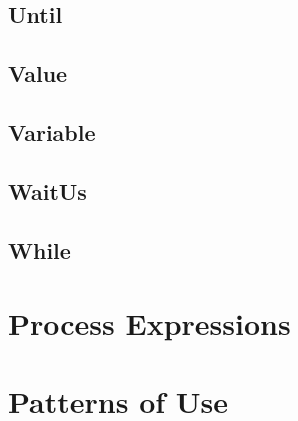 \subsection{Until}
\subsection{Value}
\subsection{Variable}
\subsection{WaitUs}
\subsection{While}

\section{Process Expressions}

\section{Patterns of Use}
